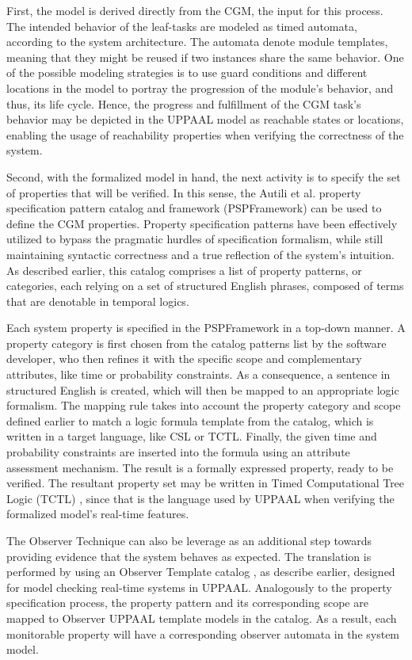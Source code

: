 First, the model is derived directly from the CGM, the input for this process. The intended behavior of the leaf-tasks are modeled as timed automata, according to the system architecture. The automata denote module templates, meaning that they might be reused if two instances share the same behavior. One of the possible modeling strategies is to use guard conditions and different locations in the model to portray the progression of the module's behavior, and thus, its life cycle. Hence, the progress and fulfillment of the CGM task's behavior may be depicted in the UPPAAL model as reachable states or locations, enabling the usage of reachability properties when verifying the correctness of the system.

Second, with the formalized model in hand, the next activity is to specify the set of properties that will be verified. In this sense, the Autili et al. \cite{2015PropertySpecCatalog} property specification pattern catalog and framework (PSPFramework) can be used to define the CGM properties. Property specification patterns have been effectively utilized to bypass the pragmatic hurdles of specification formalism, while still maintaining syntactic correctness and a true reflection of the system's intuition. As described earlier, this catalog comprises a list of property patterns, or categories, each relying on a set of structured English phrases, composed of terms that are denotable in temporal logics.

Each system property is specified in the PSPFramework in a top-down manner. A property category is first chosen from the catalog patterns list by the software developer, who then refines it with the specific scope and complementary attributes, like time or probability constraints. As a consequence, a sentence in structured English is created, which will then be mapped to an appropriate logic formalism. The mapping rule takes into account the property category and scope defined earlier to match a logic formula template from the catalog, which is written in a target language, like CSL or TCTL. Finally, the given time and probability constraints are inserted into the formula using an attribute assessment mechanism. The result is a formally expressed property, ready to be verified. The resultant property set may be written in Timed Computational Tree Logic (TCTL) \cite{1996TCTL}, since that is the language used by UPPAAL when verifying the formalized model's real-time features. 

The Observer Technique can also be leverage as an additional step towards providing evidence that the system behaves as expected. The translation is performed by using an Observer Template catalog \cite{2022PSP}, as describe earlier, designed for model checking real-time systems in UPPAAL. Analogously to the property specification process, the property pattern and its corresponding scope are mapped to Observer UPPAAL template models in the catalog. As a result, each monitorable property will have a corresponding observer automata in the system model.

